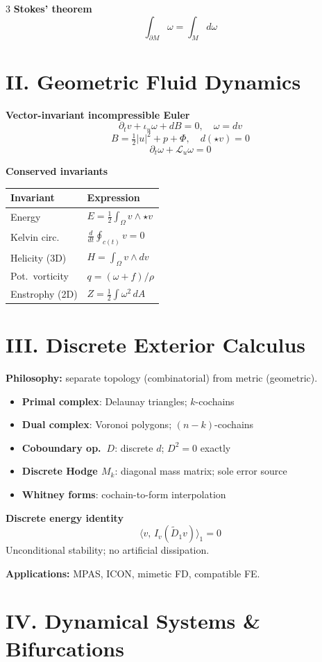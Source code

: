 \documentclass[9pt,letterpaper]{extarticle}
\newcommand{\sect}[1]{\section*{#1}}
\newcommand{\T}[1]{\textbf{#1}}
\begin{document}
\begin{multicols}{3}
\T{Stokes' theorem}
\[\int_{\partial M}\omega = \int_M d\omega\]

\sect{II. Geometric Fluid Dynamics}

\T{Vector-invariant incompressible Euler}
\[\partial_t v + \iota_u\omega + dB = 0,\quad \omega = dv\]
\[B = \tfrac{1}{2}|u|^2 + p + \Phi, \quad d(\star v) = 0\]
\[\partial_t\omega + \mathcal{L}_u\omega = 0\]

\T{Conserved invariants}\\[2pt]
\begin{tabular}{@{}ll@{}}
\toprule
Invariant & Expression \\
\midrule
Energy & $E = \tfrac{1}{2}\int_\Omega v\wedge\star v$ \\
Kelvin circ. & $\tfrac{d}{dt}\oint_{c(t)}v = 0$ \\
Helicity (3D) & $H = \int_\Omega v\wedge dv$ \\
Pot.\ vorticity & $q = (\omega+f)/\rho$ \\
Enstrophy (2D) & $Z = \tfrac{1}{2}\int\omega^2\,dA$ \\
\bottomrule
\end{tabular}

\sect{III. Discrete Exterior Calculus}

\T{Philosophy:} separate topology (combinatorial) from metric (geometric).

\begin{itemize}
  \item \T{Primal complex}: Delaunay triangles; $k$-cochains
  \item \T{Dual complex}: Voronoi polygons; $(n{-}k)$-cochains
  \item \T{Coboundary op.\ $D$}: discrete $d$; $D^2=0$ exactly
  \item \T{Discrete Hodge $M_k$}: diagonal mass matrix; sole error source
  \item \T{Whitney forms}: cochain-to-form interpolation
\end{itemize}

\T{Discrete energy identity}
\[\langle v,\,I_v(\tilde{D}_1 v)\rangle_1 = 0\]
Unconditional stability; no artificial dissipation.

\T{Applications:} MPAS, ICON, mimetic FD, compatible FE.

\sect{IV. Dynamical Systems \& Bifurcations}


\end{multicols}
\end{document}
